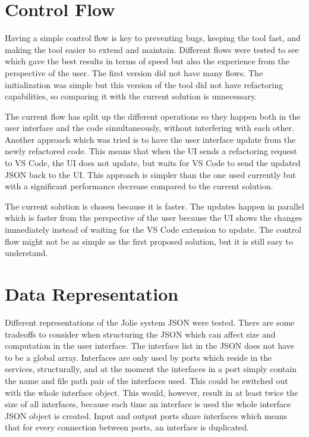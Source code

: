 \section{Control Flow} %
Having a simple control flow is key to preventing bugs, keeping the tool fast, and making the tool easier to extend and maintain.
Different flows were tested to see which gave the best results in terms of speed but also the experience from the perspective of the user.
The first version did not have many flows. The initialization was simple but this version of the tool did not have refactoring capabilities, so comparing it with the current solution is unnecessary.

The current flow has split up the different operations so they happen both in the user interface and the code simultaneously, without interfering with each other. Another approach which was tried is to have the user interface update from the newly refactored code. This means that when the UI sends a refactoring request to VS Code, the UI does not update, but waits for VS Code to send the updated JSON back to the UI.
This approach is simpler than the one used currently but with a significant performance decrease compared to the current solution.

The current solution is chosen because it is faster. The updates happen in parallel which is faster from the perspective of the user because the UI shows the changes immediately instead of waiting for the VS Code extension to update. The control flow might not be as simple as the first proposed solution, but it is still easy to understand.

\section{Data Representation}
Different representations of the Jolie system JSON were tested. There are some tradeoffs to consider when structuring the JSON which can affect size and computation in the user interface.
The interface list in the JSON does not have to be a global array. Interfaces are only used by ports which reside in the services, structurally, and at the moment the interfaces in a port simply contain the name and file path pair of the interfaces used. This could be switched out with the whole interface object.
This would, however, result in at least twice the size of all interfaces, because each time an interface is used the whole interface JSON object is created. Input and output ports share interfaces which means that for every connection between ports, an interface is duplicated.

